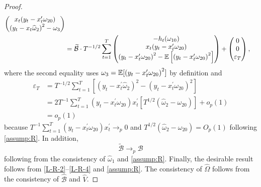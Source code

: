 \begin{proof}
\begin{align}
\begin{pmatrix}
%
        x_{t}(y_{t}-x_{t}^{\prime }\omega _{20}) \\ 
%
        \left( y_{t}-x_{t}\widehat{\omega }_{2}\right) ^{2}-\omega _{3}%
    \end{pmatrix}  \nonumber \\
%
    &=
%
    \widetilde{\mathcal{B}}\cdot T^{-1/2}\sum_{t=1}^{T} 
%
    \begin{pmatrix}
        -h_{t}(\omega _{10}) \\ 
%
        x_{t}(y_{t}-x_{t}^{\prime }\omega _{20}) \\ 
%
        \left( y_{t}-x_{t}^{\prime }\omega _{20}\right) ^{2}-\E\left[\left( y_{t}-x_{t}^{\prime }\omega _{20}\right)^{2}\right]%
%
    \end{pmatrix}%
%
    +
%
    \begin{pmatrix}
        0 \\ 
        0 \\ 
        \varepsilon_{T}
    \end{pmatrix},
%
    \label{L-R-2}
%
\end{align}%
%
where the second equality uses $\omega _{3}=\operatorname{\mathbb{E}}[\left( y_{t}-x_{t}^{\prime }\omega _{20}\right) ^{2}]$ by definition and 
%
\begin{align}
    \varepsilon _{T} 
%
    &= T^{-1/2}\sum_{t=1}^{T}\left[ \left( y_{t}-x_{t}^{\prime } \widehat{\omega }_{2}\right) ^{2}-\left( y_{t}-x_{t}^{\prime }\omega _{20}\right) ^{2}\right]  \nonumber \\
%
    &= 2T^{-1}\sum_{t=1}^{T}\left( y_{t}-x_{t}^{\prime }\omega _{20}\right) x_{t}^{\prime }\left[ T^{1/2}\left( \widehat{\omega }_{2}-\omega _{20}\right) \right] +o_{p}(1)  \nonumber \\
%
    &= o_{p}(1)  
%
    \label{L-R-3}
\end{align}
%
because $T^{-1}\sum_{t=1}^{T}\left( y_{t}-x_{t}^{\prime }\omega _{20}\right) x_{t}^{\prime }\rightarrow _{p}0$ and $T^{1/2}(\widehat{\omega }_{2}-\omega _{20})=O_{p}(1)$ following \cref{assump:R}. 
In addition, 
%
\begin{equation}
    \widetilde{\mathcal{B}}\rightarrow _{p}\mathcal{B}  
    \label{L-R-4}
\end{equation}%
%
following from the consistency of $\widehat{\omega}_{1}$ and \cref{assump:R}.  Finally, the desirable result follows from \cref{L-R-2}--\cref{L-R-4} and \cref{assump:R}.  The consistency of $\widehat{\Omega }$ follows from the consistency of $\widehat{\mathcal{B}}$ and $\widehat{V}$. 

\end{proof}

